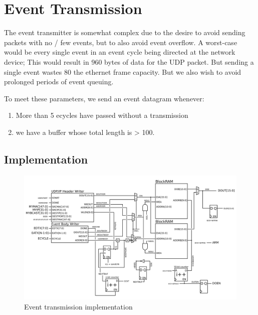 \section{Event Transmission}

The event transmitter is somewhat complex due to the desire to avoid
sending packets with no / few events, but to also avoid event
overflow. A worst-case would be every single event in an event cycle
being directed at the network device; This would result in 960 bytes
of data for the UDP packet. But sending a single event wastes 80%
the ethernet frame capacity. But we also wish to avoid prolonged
periods of event queuing.

To meet these parameters, we send an event datagram whenever: 
\begin{enumerate}
\item More than 5 ecycles have passed without a transmission
\item we have a buffer whose total length is > 100. 
\end{enumerate} 

\subsection{Implementation}
\begin{figure}
\begin{centering}
\includegraphics[scale=0.8]{eventtx.svg}
\end{centering}
\caption{Event transmission implementation}
\label{eventtx}
\end{figure}

